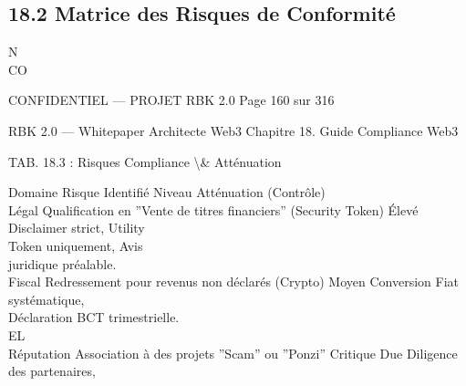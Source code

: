 \subsection{18.2 Matrice des Risques de Conformité}
N\\
CO\\
\vspace{0.5em}
\vspace{0.5em}
\vspace{0.5em}
\vspace{0.5em}
\begin{confidential}CONFIDENTIEL — PROJET RBK 2.0                                      Page 160 sur 316\end{confidential}
RBK 2.0 — Whitepaper Architecte Web3                                                                         Chapitre 18. Guide Compliance Web3\\
\vspace{0.5em}
\vspace{0.5em}
\vspace{0.5em}
\vspace{0.5em}
\begin{center}\begin{tabular}TAB. 18.3 : Risques Compliance \textbackslash{}& Atténuation\end{tabular}\end{center}
\vspace{0.5em}
\vspace{0.5em}
Domaine       Risque Identifié                                                 Niveau Atténuation (Contrôle)\\
Légal         Qualification en ”Vente de titres financiers” (Security Token)    Élevé   Disclaimer strict, Utility\\
Token uniquement, Avis\\
juridique préalable.\\
Fiscal        Redressement pour revenus non déclarés (Crypto)                  Moyen    Conversion Fiat systématique,\\
Déclaration BCT trimestrielle.\\
\vspace{0.5em}
\vspace{0.5em}
\vspace{0.5em}
\vspace{0.5em}
EL\\
Réputation    Association à des projets ”Scam” ou ”Ponzi”                      Critique Due Diligence des partenaires,\\
